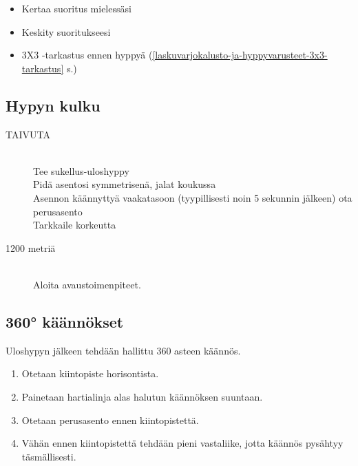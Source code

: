 \begin{multicols}{2}
\begin{itemize}
\item Kertaa suoritus mielessäsi 
\item Keskity suoritukseesi 
\item 3X3 -tarkastus ennen hyppyä (\ref{laskuvarjokalusto-ja-hyppyvarusteet-3x3-tarkastus} s.\pageref{laskuvarjokalusto-ja-hyppyvarusteet-3x3-tarkastus}) 
\end{itemize}
\subsection{ Hypyn kulku }
\label{pl-peruskoulutuksen-suoritukset-hypyn-kulku}

\begin{description}
\item[TAIVUTA] \hfill \\ 
Tee sukellus-uloshyppy \hfill \\ 
Pidä asentosi symmetrisenä, jalat koukussa \hfill \\ 
Asennon käännyttyä vaakatasoon (tyypillisesti noin 5 sekunnin jälkeen) ota perusasento \hfill \\ 
Tarkkaile korkeutta \hfill \\ 
\item[1200 metriä] \hfill \\ 
Aloita avaustoimenpiteet. \hfill \\ 
\end{description}

\end{multicols}\pagebreak\begin{multicols}{2} 

\section{ 360° käännökset }
\label{pl-peruskoulutuksen-suoritukset-360deg-kaannokset}


Uloshypyn jälkeen tehdään hallittu 360 asteen käännös. 

\begin{enumerate}[label=\bfseries \arabic*)]
\item Otetaan kiintopiste horisontista. 
\item Painetaan hartialinja alas halutun käännöksen suuntaan. 
\item Otetaan perusasento ennen kiintopistettä. 
\item Vähän ennen kiintopistettä tehdään pieni vastaliike, jotta käännös pysähtyy täsmällisesti. 
\end{enumerate}


\end{multicols}
